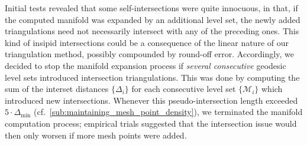 

Initial tests revealed that some self-intersections were quite innocuous, in
that, if the computed manifold was expanded by an additional level set,
the newly added triangulations need not necessarily intersect with any of the
preceding ones. This kind of insipid intersections could be a consequence of the
linear nature of our triangulation method, possibly compounded by round-off
error. Accordingly, we decided to stop the manifold expansion process
if \emph{several consecutive} geodesic level sets introduced intersection
triangulations. This was done by computing the sum of the interset distances
$\{\Delta_{i}\}$ for each consecutive level set $\{\mathcal{M}_{i}\}$ which
introduced new intersections. Whenever this pseudo-intersection length
exceeded $5\cdot\Delta_{\min}$ (cf.\ \cref{sub:maintaining_mesh_point_density}),
we terminated the manifold computation process; empirical trials suggested
that the intersection issue would then only worsen if more mesh points were
added.

